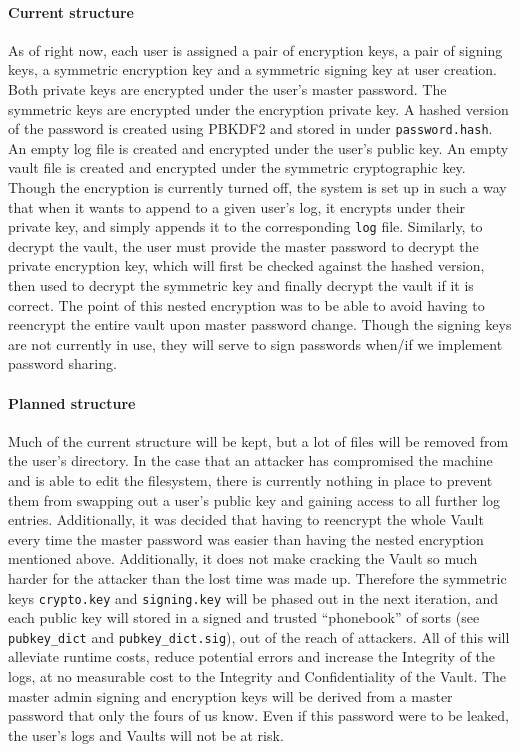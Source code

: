 \documentclass{article}
\begin{document}
\paragraph{Current structure} As of right now, each user is assigned a pair of encryption keys, a pair of signing keys, a symmetric encryption key and a symmetric signing key at user creation. Both private keys are encrypted under the user's master password. The symmetric keys are encrypted under the encryption private key. A hashed version of the password is created using PBKDF2 and stored in under \texttt{password.hash}. An empty log file is created and encrypted under the user's public key. An empty vault file is created and encrypted under the symmetric cryptographic key. Though the encryption is currently turned off, the system is set up in such a way that when it wants to append to a given user's log, it encrypts under their private key, and simply appends it to the corresponding \texttt{log} file. Similarly, to decrypt the vault, the user must provide the master password to decrypt the private encryption key, which will first be checked against the hashed version, then used to decrypt the symmetric key and finally decrypt the vault if it is correct. The point of this nested encryption was to be able to avoid having to reencrypt the entire vault upon master password change. Though the signing keys are not currently in use, they will serve to sign passwords when/if we implement password sharing.
\paragraph{Planned structure} Much of the current structure will be kept, but a lot of files will be removed from the user's directory. In the case that an attacker has compromised the machine and is able to edit the filesystem, there is currently nothing in place to prevent them from swapping out a user's public key and gaining access to all further log entries. Additionally, it was decided that having to reencrypt the whole Vault every time the master password was easier than having the nested encryption mentioned above. Additionally, it does not make cracking the Vault so much harder for the attacker than the lost time was made up. Therefore the symmetric keys \texttt{crypto.key} and \texttt{signing.key} will be phased out in the next iteration, and each public key will stored in a signed and trusted ``phonebook'' of sorts (see \texttt{pubkey\_dict} and \texttt{pubkey\_dict.sig}), out of the reach of attackers. All of this will alleviate runtime costs, reduce potential errors and increase the Integrity of the logs, at no measurable cost to the Integrity and Confidentiality of the Vault. The master admin signing and encryption keys will be derived from a master password that only the fours of us know. Even if this password were to be leaked, the user's logs and Vaults will not be at risk.
\end{document}
